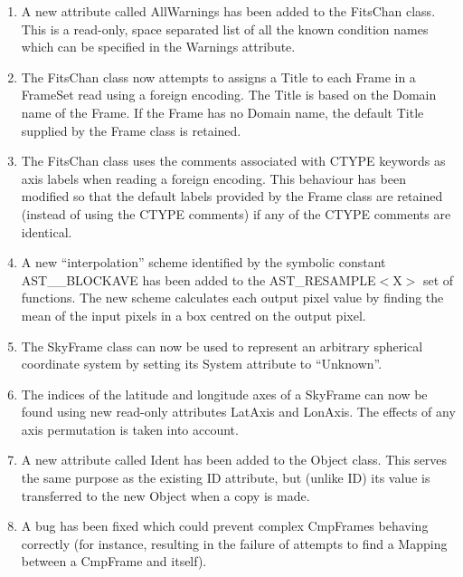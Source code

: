 \documentclass[twoside,11pt]{article}
\newcommand{\htmlref}[2]{#1}
\begin{document}
\begin{enumerate}
\item A new attribute called \htmlref{AllWarnings}{AllWarnings} has been added to the FitsChan 
class. This is a read-only, space separated list of all the known condition 
names which can be specified in the Warnings attribute.

\item The FitsChan class now attempts to assigns a \htmlref{Title}{Title} to each Frame in
a FrameSet read using a foreign encoding. The Title is based on the Domain
name of the Frame. If the Frame has no Domain name, the default Title
supplied by the Frame class is retained.

\item The FitsChan class uses the comments associated with CTYPE
keywords as axis labels when reading a foreign encoding. This behaviour 
has been modified so that the default labels provided by the Frame class
are retained (instead of using the CTYPE comments) if any of the CTYPE 
comments are identical.

\item A new ``interpolation'' scheme identified by the symbolic constant
AST\_\_BLOCKAVE has been added to the \htmlref{AST\_RESAMPLE$<$X$>$}{AST_RESAMPLEX} set of
functions. The new scheme calculates each output pixel value by finding
the mean of the input pixels in a box centred on the output pixel.

\item The SkyFrame class can now be used to represent an arbitrary spherical
coordinate system by setting its System attribute to ``Unknown''.

\item The indices of the latitude and longitude axes of a SkyFrame can
now be found using new read-only attributes \htmlref{LatAxis}{LatAxis} and \htmlref{LonAxis}{LonAxis}. The
effects of any axis permutation is taken into account.

\item A new attribute called Ident has been added to the \htmlref{Object}{Object} class.
This serves the same purpose as the existing \htmlref{ID}{ID} attribute, but (unlike ID)
its value is transferred to the new Object when a copy is made.

\item A bug has been fixed which could prevent complex CmpFrames
behaving correctly (for instance, resulting in the failure of attempts 
to find a \htmlref{Mapping}{Mapping} between a \htmlref{CmpFrame}{CmpFrame} and itself).

\end{enumerate}
\end{document}
